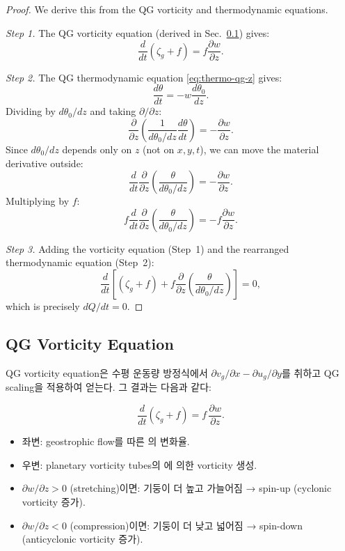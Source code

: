 
\begin{proof}
We derive this from the QG vorticity and thermodynamic equations.

\textit{Step 1.}  The QG vorticity equation (derived in Sec.~\ref{subsec:qg-vort-eq})
gives:
\[
  \frac{d}{dt}(\zeta_g + f) = f\frac{\partial w}{\partial z}.
\]

\textit{Step 2.}  The QG thermodynamic equation \eqref{eq:thermo-qg-z} gives:
\[
  \frac{d\theta}{dt} = -w\frac{d\theta_0}{dz}.
\]
Dividing by $d\theta_0/dz$ and taking $\partial/\partial z$:
\[
  \frac{\partial}{\partial z}\!\left(\frac{1}{d\theta_0/dz}\frac{d\theta}{dt}\right)
  = -\frac{\partial w}{\partial z}.
\]
Since $d\theta_0/dz$ depends only on $z$ (not on $x,y,t$), we can move the
material derivative outside:
\[
  \frac{d}{dt}\frac{\partial}{\partial z}
  \!\left(\frac{\theta}{d\theta_0/dz}\right) = -\frac{\partial w}{\partial z}.
\]
Multiplying by $f$:
\[
  f\frac{d}{dt}\frac{\partial}{\partial z}
  \!\left(\frac{\theta}{d\theta_0/dz}\right) = -f\frac{\partial w}{\partial z}.
\]

\textit{Step 3.}  Adding the vorticity equation (Step~1) and the rearranged
thermodynamic equation (Step~2):
\[
  \frac{d}{dt}\!\left[
    (\zeta_g + f) + f\frac{\partial}{\partial z}
    \!\left(\frac{\theta}{d\theta_0/dz}\right)
  \right] = 0,
\]
which is precisely $dQ/dt = 0$.
\end{proof}

\subsection{QG Vorticity Equation}\label{subsec:qg-vort-eq}

QG vorticity equation은 수평 운동량 방정식에서
$\partial v_g/\partial x - \partial u_g/\partial y$를 취하고 QG scaling을
적용하여 얻는다.  그 결과는 다음과 같다:

\begin{equation}\label{eq:qg-vort-z}
  \boxed{
  \frac{d}{dt}(\zeta_g + f) = f\,\frac{\partial w}{\partial z}.
  }
\end{equation}

\begin{remark}
\begin{itemize}
  \item 좌변: geostrophic flow를 따른 의 변화율.
  \item 우변: planetary vorticity tubes의 에 의한
        vorticity 생성.
  \item $\partial w/\partial z > 0$ (stretching)이면: 기둥이 더 높고 가늘어짐 → spin-up (cyclonic vorticity 증가).
  \item $\partial w/\partial z < 0$ (compression)이면: 기둥이 더 낮고 넓어짐 → spin-down (anticyclonic vorticity 증가).
\end{itemize}
\end{remark}

